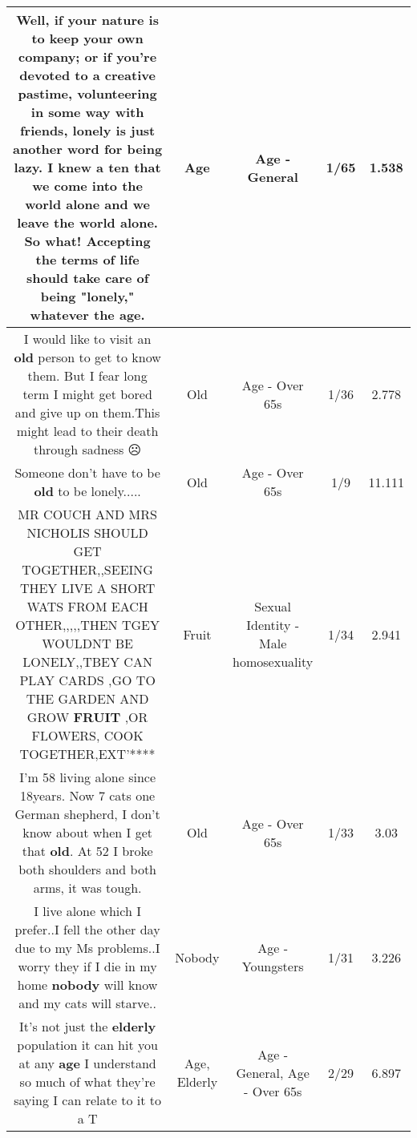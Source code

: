 \documentclass[11pt]{article}
\newlength\mylength
\begin{document}
\begin{center}
\begin{longtable}{|C{.65\mylength}|C{.30\mylength}|C{.12\mylength}|C{.12\mylength}|C{.12\mylength}|}
  \small Well, if your nature is to keep your own company; or if you're devoted to a creative pastime, volunteering in some way with friends, lonely is just another word for being lazy.  I knew a ten that we come into the world alone and we leave the world alone.  So what!  Accepting the terms of life should take care of being "lonely," whatever the \textbf{age}.\normalsize   & Age & Age - General & 1/65 & 1.538 \\  \hline
  \small I would like to visit an \textbf{old} person to get to know them. But I fear long term I might get bored and give up on them.This might lead to their death through sadness ☹️\normalsize   & Old & Age - Over 65s & 1/36 & 2.778 \\  \hline
  \small Someone don't have to be \textbf{old} to be lonely.....\normalsize   & Old & Age - Over 65s & 1/9 & 11.111 \\  \hline
  \small MR COUCH AND MRS NICHOLIS SHOULD GET TOGETHER,,SEEING THEY LIVE A SHORT WATS FROM EACH OTHER,,,,,THEN TGEY WOULDNT BE LONELY,,TBEY CAN PLAY CARDS ,GO TO THE GARDEN AND GROW \textbf{FRUIT} ,OR FLOWERS, COOK TOGETHER,EXT'****\normalsize   & Fruit & Sexual Identity - Male homosexuality & 1/34 & 2.941 \\  \hline
  \small I'm 58 living alone since 18years. Now 7 cats one German shepherd, I don't know about when I get that \textbf{old}.  At 52 I broke both shoulders and both arms, it was tough.\normalsize   & Old & Age - Over 65s & 1/33 & 3.03 \\  \hline
  \small I live alone which I prefer..I fell the other day due to my Ms problems..I worry they if I die in my home \textbf{nobody} will know and my cats will starve..\normalsize   & Nobody & Age - Youngsters & 1/31 & 3.226 \\  \hline
  \small It's not just the \textbf{elderly} population it can hit you at any \textbf{age} I understand so much of what they're saying I can relate to it to a T\normalsize   & Age, Elderly & Age - General, Age - Over 65s & 2/29 & 6.897 \\  \hline

\end{longtable}
\end{center}
\end{document}
